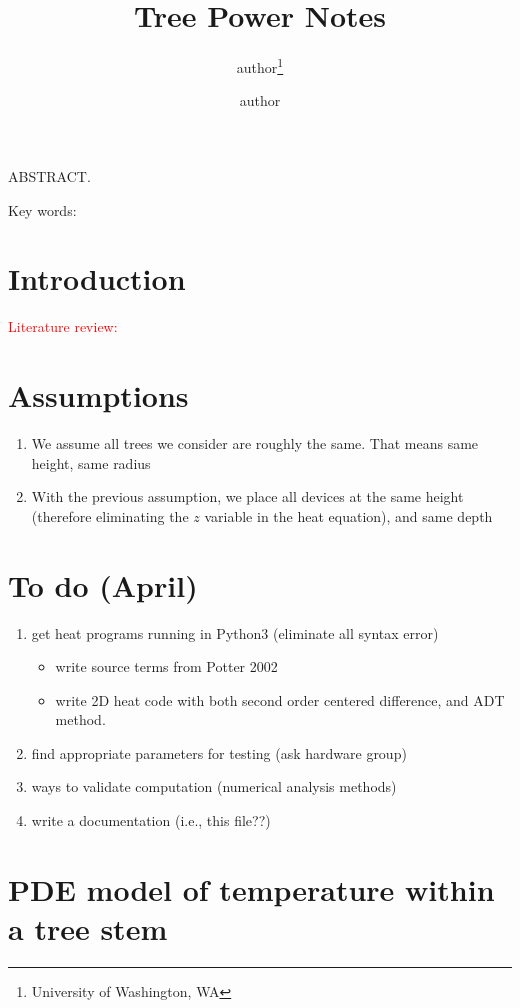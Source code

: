 \documentclass[12pt]{article}
\title{Tree Power Notes}
\author{author\thanks{University of Washington, WA} %
\and author\footnotemark[1]}
\begin{document}
\maketitle

\noindent ABSTRACT. 

\vspace{1cm}

\noindent Key words: 


\section*{Introduction}  \textcolor{red}{Literature review:}



\section{Assumptions}

\begin{enumerate}
\item We assume all trees we consider are roughly the same. That means same height, same radius
\item With the previous assumption, we place all devices at the same height (therefore eliminating the $z$ variable in the heat equation), and same depth
\end{enumerate}

\section{To do (April)}
\begin{enumerate}
\item get heat programs running in Python3 (eliminate all syntax error)
\begin{itemize}
\item write source terms from Potter 2002
\item write 2D heat code with both second order centered difference, and ADT method.
\end{itemize}
\item find appropriate parameters for testing (ask hardware group)
\item ways to validate computation (numerical analysis methods)
\item write a documentation (i.e., this file??)
\end{enumerate}

\section{PDE model of temperature within a tree stem}
\end{document}
